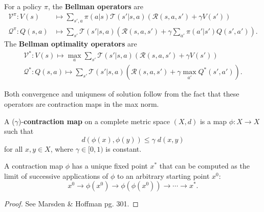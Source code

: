 \documentclass[twoside,10pt]{report}
\begin{document}
\begin{defn}
	For a policy $\pi$, the \textbf{Bellman operators} are
	\begin{align*}
		\mathcal{V}^{\pi}: V(s) &\mapsto \sum_{s',a} \pi(a|s) \mathcal{T}(s'|s,a) \left( \mathcal{R}(s,a,s') + \gamma V(s') \right) \\
		\mathcal{Q}^{\pi}: Q(s,a) &\mapsto \sum_{s'} \mathcal{T}(s'|s,a) \left( \mathcal{R}(s,a,s') + \gamma \sum_{a'} \pi(a'|s') Q(s',a') \right).
	\end{align*}
	The \textbf{Bellman optimality operators} are
	\begin{align*}
		\mathcal{V}^{*}: V(s) \mapsto \max_{a} \sum_{s'} \mathcal{T}(s'|s,a) \left( \mathcal{R}(s,a,s') + \gamma V(s') \right) \\
		\mathcal{Q}^{*}: Q(s,a) \mapsto \sum_{s'} \mathcal{T}(s'|s,a) \left( \mathcal{R}(s,a,s') + \gamma \max_{a'}Q^{*}(s',a') \right).
	\end{align*}
\end{defn}

Both convergence and uniquness of solution follow from the fact that these operators are contraction maps in the max norm.

\begin{defn}[]
A ($\gamma$)-\textbf{contraction map} on a complete metric space $(X,d)$ is a map $\phi:X\to X$ such that
\[
d(\phi(x), \phi(y)) \leq \gamma \; d(x,y)
\] for all $x,y \in X$, where $\gamma \in [0, 1)$ is constant.
\end{defn}

\begin{thrm}
	A contraction map $\phi$ has a unique fixed point $x^{*}$ that can be computed as the limit of successive applications of $\phi$ to an arbitrary starting point $x^{0}$:
	\[
	x^{0} \to \phi(x^{0}) \to \phi(\phi(x^{0})) \to \cdots \to x^{*}.
	\] 
\end{thrm}
\begin{proof}
	See Marsden \& Hoffman pg. 301.
\end{proof}
\end{document}
